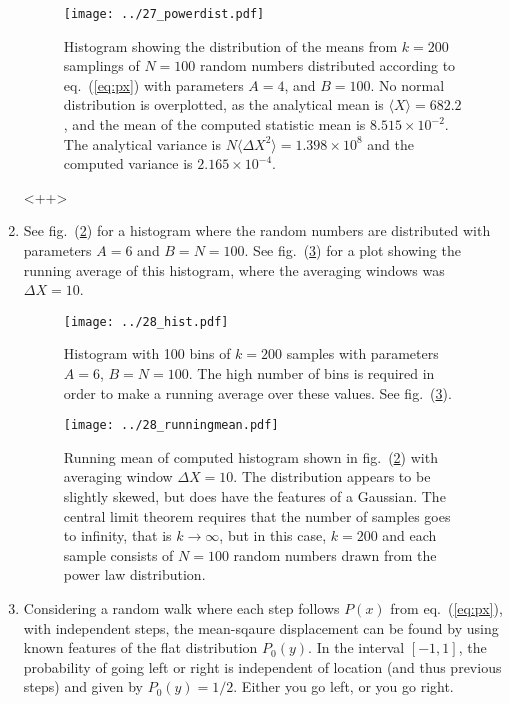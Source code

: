 \documentclass[a4paper,11pt]{article}
\begin{document}
\begin{enumerate}
        \begin{figure}[htb]
            \centering
            \texttt{[image: ../27\_powerdist.pdf]}
            \caption{Histogram showing the distribution of the means from $k= 200$ samplings of $N=100$ random numbers distributed according to eq.~(\ref{eq:px}) with parameters $A = 4$, and $B = 100$. No normal distribution is overplotted, as the analytical mean is $\langle X \rangle = 682.2$, and the mean of the computed statistic mean is $8.515 \times 10^{-2}$. The analytical variance is $N \langle \Delta X^2 \rangle = 1.398 \times 10^{8}$ and the computed variance is $2.165 \times 10^{-4}$.   }
            \label{fig:27_powerdist}
        \end{figure}<++>


    \item See fig.~(\ref{fig:28_hist}) for a histogram where the random numbers are distributed with parameters $A = 6$ and $B = N = 100$. See fig.~(\ref{fig:28_runningmean}) for a plot showing the running average of this histogram, where the averaging windows was $\Delta X = 10$.  

        \begin{figure}[htb]
            \centering
            \texttt{[image: ../28\_hist.pdf]}
            \caption{Histogram with 100 bins of $k=200$ samples with parameters $A = 6$, $B = N = 100$. The high number of bins is required in order to make a running average over these values. See fig.~(\ref{fig:28_runningmean}). }
            \label{fig:28_hist}
        \end{figure}

        \begin{figure}[htb]
            \centering
            \texttt{[image: ../28\_runningmean.pdf]}
            \caption{Running mean of computed histogram shown in fig.~(\ref{fig:28_hist}) with averaging window $\Delta X = 10$. The distribution appears to be slightly skewed, but does have the features of a Gaussian. The central limit theorem requires that the number of samples goes to infinity, that is $k \to \infty$, but in this case, $k=200$ and each sample consists of $N=100$ random numbers drawn from the power law distribution.    }
            \label{fig:28_runningmean}
        \end{figure}

    \item Considering a random walk where each step follows $P(x)$ from eq.~(\ref{eq:px}), with independent steps, the mean-sqaure displacement can be found by using known features of the flat distribution $P_0(y)$. In the interval $[-1,1]$, the probability of going left or right is independent of location (and thus previous steps) and given by $P_0(y) = 1/2$. Either you go left, or you go right.


\end{enumerate}
\end{document}
